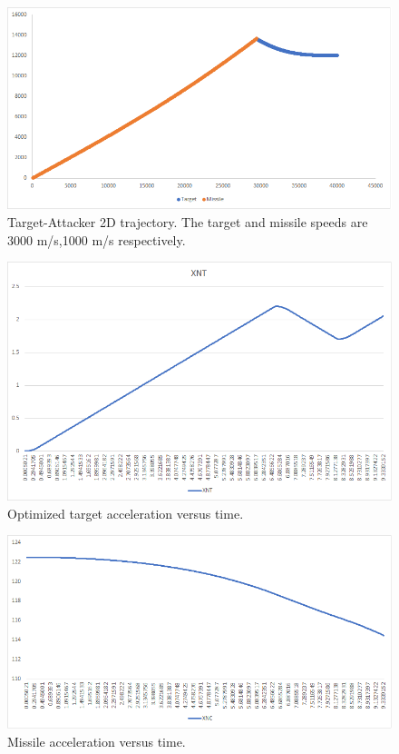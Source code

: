  \begin{figure}[H]
	\centering
	\includegraphics[scale = 0.70]{fig/trajectory.PNG}
	\caption{Target-Attacker 2D trajectory. The target and missile speeds are 3000 m/s,1000 m/s respectively.}
	\label{trajectory}
\end{figure}

 \begin{figure}[H]
	\centering
	\includegraphics[scale = 0.70]{fig/XNT.PNG}
	\caption{Optimized target acceleration versus time.}
	\label{XNT}
\end{figure}

 \begin{figure}[H]
	\centering
	\includegraphics[scale = 0.70]{fig/XNC.PNG}
	\caption{Missile acceleration versus time.}
	\label{XNC}
\end{figure}


